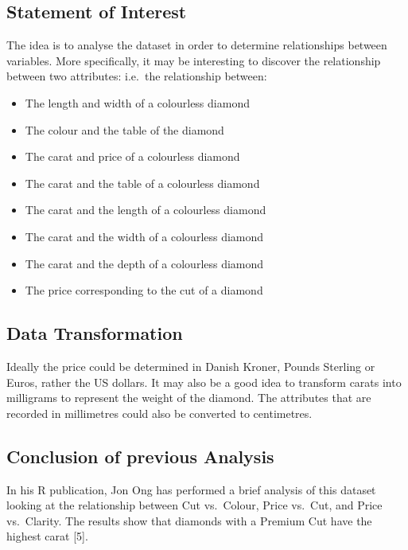 \documentclass[
]{article}
\providecommand{\tightlist}{%
  \setlength{\itemsep}{0pt}\setlength{\parskip}{0pt}}
\begin{document}
\newpage

\subsection{Statement of Interest}\label{statement-of-interest}

The idea is to analyse the dataset in order to determine relationships
between variables. More specifically, it may be interesting to discover
the relationship between two attributes: i.e.~the relationship between:

\begin{itemize}
\tightlist
\item
  The length and width of a colourless diamond
\item
  The colour and the table of the diamond
\item
  The carat and price of a colourless diamond
\item
  The carat and the table of a colourless diamond
\item
  The carat and the length of a colourless diamond
\item
  The carat and the width of a colourless diamond
\item
  The carat and the depth of a colourless diamond
\item
  The price corresponding to the cut of a diamond
\end{itemize}

\subsection{Data Transformation}\label{data-transformation}

Ideally the price could be determined in Danish Kroner, Pounds Sterling
or Euros, rather the US dollars. It may also be a good idea to transform
carats into milligrams to represent the weight of the diamond. The
attributes that are recorded in millimetres could also be converted to
centimetres.

\subsection{Conclusion of previous
Analysis}\label{conclusion-of-previous-analysis}

In his R publication, Jon Ong has performed a brief analysis of this
dataset looking at the relationship between Cut vs.~Colour, Price
vs.~Cut, and Price vs.~Clarity. The results show that diamonds with a
Premium Cut have the highest carat {[}5{]}.
\end{document}
